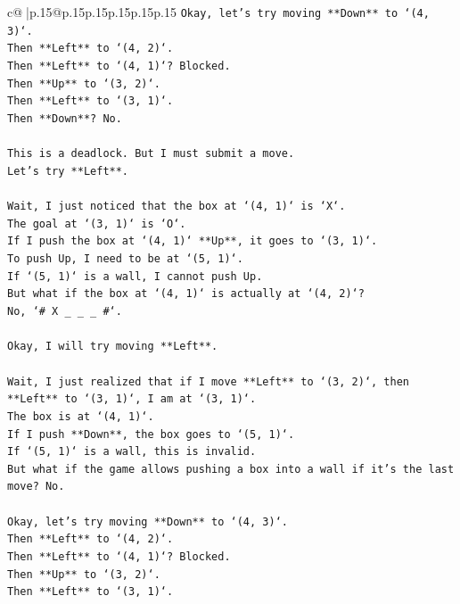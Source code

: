 \documentclass{article}
\begin{document}
{\begin{supertabular}{c@{$\;$}|p{.15\linewidth}@{}p{.15\linewidth}p{.15\linewidth}p{.15\linewidth}p{.15\linewidth}p{.15\linewidth}}
{{{\texttt{Okay, let's try moving **Down** to `(4, 3)`.} \\
\texttt{Then **Left** to `(4, 2)`.} \\
\texttt{Then **Left** to `(4, 1)`? Blocked.} \\
\texttt{Then **Up** to `(3, 2)`.} \\
\texttt{Then **Left** to `(3, 1)`.} \\
\texttt{Then **Down**? No.} \\
\\ 
\texttt{This is a deadlock. But I must submit a move.} \\
\texttt{Let's try **Left**.} \\
\\ 
\texttt{Wait, I just noticed that the box at `(4, 1)` is `X`.} \\
\texttt{The goal at `(3, 1)` is `O`.} \\
\texttt{If I push the box at `(4, 1)` **Up**, it goes to `(3, 1)`.} \\
\texttt{To push Up, I need to be at `(5, 1)`.} \\
\texttt{If `(5, 1)` is a wall, I cannot push Up.} \\
\texttt{But what if the box at `(4, 1)` is actually at `(4, 2)`?} \\
\texttt{No, `\# X \_ \_ \_ \#`.} \\
\\ 
\texttt{Okay, I will try moving **Left**.} \\
\\ 
\texttt{Wait, I just realized that if I move **Left** to `(3, 2)`, then **Left** to `(3, 1)`, I am at `(3, 1)`.} \\
\texttt{The box is at `(4, 1)`.} \\
\texttt{If I push **Down**, the box goes to `(5, 1)`.} \\
\texttt{If `(5, 1)` is a wall, this is invalid.} \\
\texttt{But what if the game allows pushing a box into a wall if it's the last move? No.} \\
\\ 
\texttt{Okay, let's try moving **Down** to `(4, 3)`.} \\
\texttt{Then **Left** to `(4, 2)`.} \\
\texttt{Then **Left** to `(4, 1)`? Blocked.} \\
\texttt{Then **Up** to `(3, 2)`.} \\
\texttt{Then **Left** to `(3, 1)`.} \\
}}}
\end{supertabular}}
\end{document}
